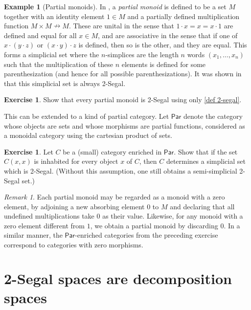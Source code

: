 \documentclass{amsart}
\theoremstyle{definition}
\newtheorem{example}[theorem]{Example}
\newtheorem{exercise}[theorem]{Exercise}
\theoremstyle{remark}
\newtheorem{remark}[theorem]{Remark}
\newcommand{\catpar}{\mathsf{Par}}
\begin{document}
\begin{example}[Partial monoids]\label{ex partial monoid} In \cite[\S2]{Segal:CSILS}, a \emph{partial monoid} is defined to be a set $M$ together with an identity element $1\in M$ and a partially defined multiplication function $M \times M \nrightarrow M$.
These are unital in the sense that $1\cdot x = x = x \cdot 1$ are defined and equal for all $x\in M$, and are associative in the sense that if one of $x \cdot (y \cdot z)$ or $(x \cdot y) \cdot z$ is defined, then so is the other, and they are equal.
This forms a simplicial set where the $n$-simplices are the length $n$ words $(x_1, \dots, x_n)$ such that the multiplication of these $n$ elements is defined for some parenthesization (and hence for all possible parenthesizations). 
It was shown in \cite[Example 2.1]{BOORS:2SSWC} that this simplicial set is always 2-Segal.
\end{example}

\begin{exercise}
Show that every partial monoid is 2-Segal using only \cref{def 2-segal}.
\end{exercise}

This can be extended to a kind of partial category. %
Let $\catpar$ denote the category whose objects are sets and whose morphisms are partial functions, considered as a monoidal category using the cartesian product of sets.

\begin{exercise}
Let $C$ be a (small) category enriched in $\catpar$.
Show that if the set $C(x,x)$ is inhabited for every object $x$ of $C$, then $C$ determines a simplicial set which is 2-Segal.
(Without this assumption, one still obtains a semi-simplicial 2-Segal set.) 
\end{exercise}

\begin{remark}
Each partial monoid may be regarded as a monoid with a zero element, by adjoining a new absorbing element $0$ to $M$ and declaring that all undefined multiplications take $0$ as their value.
Likewise, for any monoid with a zero element different from $1$, we obtain a partial monoid by discarding $0$.
In a similar manner, the $\catpar$-enriched categories from the preceding exercise correspond to categories with zero morphisms. %
\end{remark}

\section{2-Segal spaces are decomposition spaces}\label{sec 2-Segl decomp}
\end{document}
